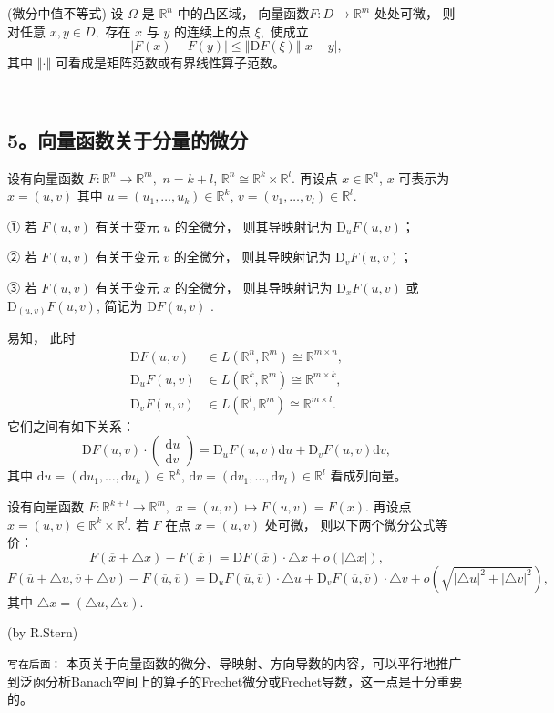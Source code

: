 \begin{theorem}{(微分中值不等式)}
设 $\Omega$ 是 $\mathbb{R}^{n}$ 中的凸区域， 向量函数$F:D\rightarrow\mathbb{R}^{m}$
处处可微， 则对任意 $x,y\in D,$ 存在 $x$ 与 $y$ 的连续上的点 $\xi,$ 使成立
\[
|F(x)-F(y)|\leqslant\left\Vert \mathrm{D}F(\xi)\right\Vert |x-y|,
\]
其中 $\left\Vert \cdot\right\Vert $ 可看成是矩阵范数或有界线性算子范数。 
\end{theorem}
\verb| |

\subsection{5。向量函数关于分量的微分}
设有向量函数 $F:\mathbb{R}^{n}\rightarrow\mathbb{R}^{m},$ $n=k+l$, $\mathbb{R}^{n}\cong\mathbb{R}^{k}\times\mathbb{R}^{l}$.
再设点 $x\in\mathbb{R}^{n}$, $x$ 可表示为 $x=(u,v)$ 其中 $u=(u_{1},\ldots,u_{k})\in\mathbb{R}^{k}$,
$v=(v_{1},\ldots,v_{l})\in\mathbb{R}^{l}.$ 

① 若 $F(u,v)$ 有关于变元 $u$ 的全微分， 则其导映射记为 $\mathrm{D}_{u}F(u,v)$；

② 若 $F(u,v)$ 有关于变元 $v$ 的全微分， 则其导映射记为 $\mathrm{D}_{v}F(u,v)$；

③ 若 $F(u,v)$ 有关于变元 $x$ 的全微分， 则其导映射记为 $\mathrm{D}_{x}F(u,v)$ 或 $\mathrm{D}_{(u,v)}F(u,v)$,
简记为 $\mathrm{D}F(u,v)$ . 

易知， 此时 
$$
\begin{aligned}
\mathrm{D}F(u,v) & \in L(\mathbb{R}^{n},\mathbb{R}^{m})\cong\mathbb{R}^{m\times n},\\
\mathrm{D}_{u}F(u,v) & \in L(\mathbb{R}^{k},\mathbb{R}^{m})\cong\mathbb{R}^{m\times k},\\
\mathrm{D}_{v}F(u,v) & \in L(\mathbb{R}^{l},\mathbb{R}^{m})\cong\mathbb{R}^{m\times l}.
\end{aligned}
$$
它们之间有如下关系：
$$
\mathrm{D}F(u,v)\cdot\left(\begin{array}{c}
\mathrm{d}u\\
\mathrm{d}v
\end{array}\right)=\mathrm{D}_{u}F(u,v)\mathrm{d}u+\mathrm{D}_{v}F(u,v)\mathrm{d}v,
$$
其中 $\mathrm{d}u=(\mathrm{d}u_{1},\ldots,\mathrm{d}u_{k})\in\mathbb{R}^{k}$,
$\mathrm{d}v=(\mathrm{d}v_{1},\ldots,\mathrm{d}v_{l})\in\mathbb{R}^{l}$
看成列向量。 

设有向量函数 $F:\mathbb{R}^{k+l}\rightarrow\mathbb{R}^{m},$ $x=(u,v)\mapsto F(u,v)=F(x)$.
再设点 $\overline{x}=(\overline{u},\overline{v})\in\mathbb{R}^{k}\times\mathbb{R}^{l}.$
若 $F$ 在点 $\overline{x}=(\overline{u},\overline{v})$ 处可微， 则以下两个微分公式等价：
\[
F(\overline{x}+\triangle x)-F(\overline{x})=\mathrm{D}F(\overline{x})\cdot\triangle x+o(|\triangle x|),
\]
\[
F(\overline{u}+\triangle u,\overline{v}+\triangle v)-F(\overline{u},\overline{v})=\mathrm{D}_{u}F(\overline{u},\overline{v})\cdot\triangle u+\mathrm{D}_{v}F(\overline{u},\overline{v})\cdot\triangle v+o(\sqrt{|\triangle u|^{2}+|\triangle v|^{2}}),
\]
其中 $\triangle x=(\triangle u,\triangle v)$.

(by R.Stern)


\verb|写在后面：| 本页关于向量函数的微分、导映射、方向导数的内容，可以平行地推广到泛函分析Banach空间上的算子的Frechet微分或Frechet导数，这一点是十分重要的。